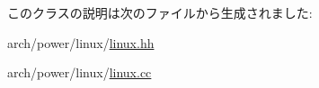 このクラスの説明は次のファイルから生成されました:\begin{DoxyCompactItemize}
\item 
arch/power/linux/\hyperlink{arch_2power_2linux_2linux_8hh}{linux.hh}\item 
arch/power/linux/\hyperlink{arch_2power_2linux_2linux_8cc}{linux.cc}\end{DoxyCompactItemize}
